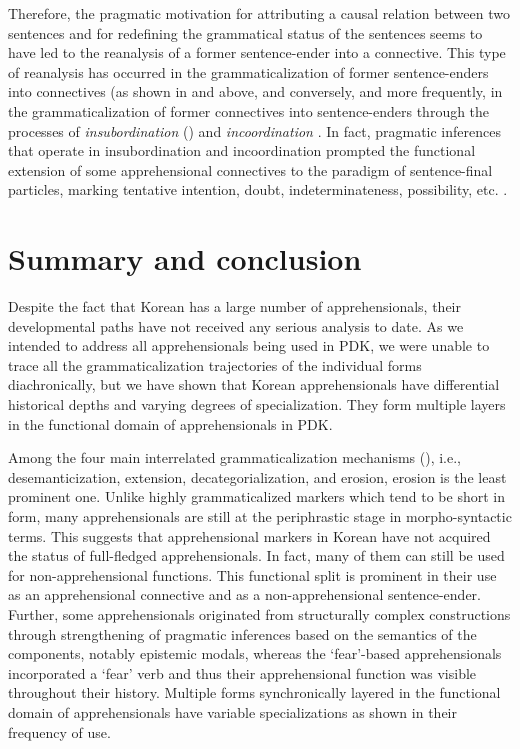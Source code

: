 \documentclass[output=paper,colorlinks,citecolor=brown]{langscibook}
\begin{document}
Therefore, the pragmatic motivation for attributing a causal relation between two sentences and for redefining the grammatical status of the sentences seems to have led to the reanalysis of a former sentence-ender into a connective. This type of reanalysis has occurred in the grammaticalization of former sentence-enders into connectives (as shown in  and  above, and conversely, and more frequently, in the grammaticalization of former connectives into sentence-enders through the processes of \textit{insubordination} (\citealt{evans2007,EvansWatanabe2016}) and \textit{incoordination} \citep{KutevaEtAl2015,KutevaEtAl2017}. In fact, pragmatic inferences that operate in insubordination and incoordination prompted the functional extension of some apprehensional connectives to the paradigm of sentence-final particles, marking tentative intention, doubt, indeterminateness, possibility, etc.  \citep{KooRhee2001,KooRhee2013,Sohn2003,RheeKoo2017}.



\section{Summary and conclusion}
\label{sec:rhee:summary}

Despite the fact that Korean has a large number of apprehensionals, their developmental paths have not received any serious analysis to date. As we intended to address all apprehensionals being used in PDK, we were unable to trace all the grammaticalization trajectories of the individual forms diachronically, but we have shown that Korean apprehensionals have differential historical depths and varying degrees of specialization. They form multiple layers in the functional domain of apprehensionals in PDK.

Among the four main interrelated grammaticalization mechanisms (\citealt[2]{HeineKuteva2002}), i.e., desemanticization, extension, decategorialization, and erosion, erosion is the least prominent one. Unlike highly grammaticalized markers which tend to be short in form, many apprehensionals are still at the periphrastic stage in morpho-syntactic terms. This suggests that apprehensional markers in Korean have not acquired the status of full-fledged apprehensionals. In fact, many of them can still be used for non-apprehensional functions. This functional split is prominent in their use as an apprehensional connective and as a non-apprehensional sentence-ender. Further, some apprehensionals originated from structurally complex constructions through strengthening of pragmatic inferences based on the semantics of the components, notably epistemic modals, whereas the `fear'-based apprehensionals incorporated a `fear' verb and thus their apprehensional function was visible throughout their history. Multiple forms synchronically layered in the functional domain of apprehensionals have variable specializations as shown in their frequency of use. 
\end{document}
